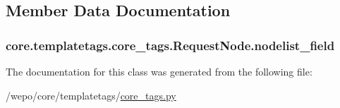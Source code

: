 \subsection{Member Data Documentation}
\hypertarget{classcore_1_1templatetags_1_1core__tags_1_1RequestNode_aa9704d30f35d2b11b9e2d11576ec2406}{
\subsubsection[{nodelist\-\_\-field}]{\setlength{\rightskip}{0pt plus 5cm}core.\-templatetags.\-core\-\_\-tags.\-Request\-Node.\-nodelist\-\_\-field}}\label{classcore_1_1templatetags_1_1core__tags_1_1RequestNode_aa9704d30f35d2b11b9e2d11576ec2406}


The documentation for this class was generated from the following file\-:\begin{DoxyCompactItemize}
\item 
/wepo/core/templatetags/\hyperlink{core__tags_8py}{core\-\_\-tags.\-py}\end{DoxyCompactItemize}

